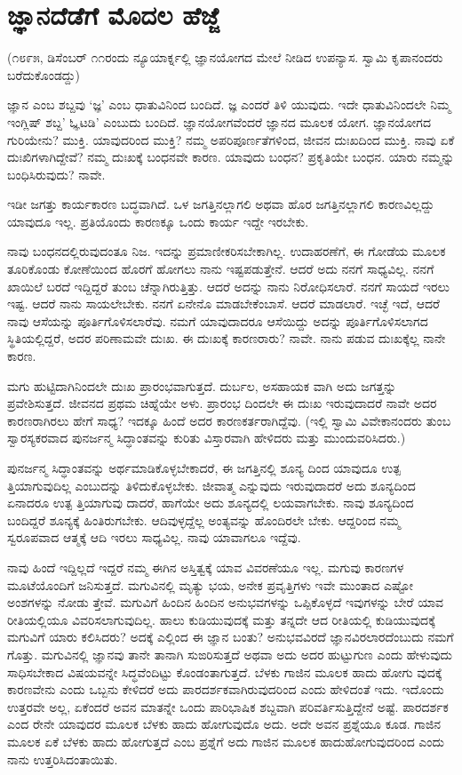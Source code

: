 
\chapter{ಜ್ಞಾನದೆಡೆಗೆ ಮೊದಲ ಹೆಜ್ಜೆ}

(೧೮೯೫, ಡಿಸೆಂಬರ್ ೧೧ರಂದು ನ್ಯೂಯಾರ್ಕ್ನಲ್ಲಿ ಜ್ಞಾನಯೋಗದ ಮೇಲೆ ನೀಡಿದ ಉಪನ್ಯಾಸ. ಸ್ವಾಮಿ ಕೃಪಾನಂದರು ಬರೆದುಕೊಂಡದ್ದು)

ಜ್ಞಾನ ಎಂಬ ಶಬ್ದವು ‘ಜ್ಞ’ ಎಂಬ ಧಾತುವಿನಿಂದ ಬಂದಿದೆ. ಜ್ಞ ಎಂದರೆ ತಿಳಿ ಯುವುದು. ಇದೇ ಧಾತುವಿನಿಂದಲೇ ನಿಮ್ಮ ಇಂಗ್ಲಿಷ್ ಶಬ್ದ’ ಓ್ಞಟಡಿ’ ಎಂಬುದು ಬಂದಿದೆ. ಜ್ಞಾನಯೋಗವೆಂದರೆ ಜ್ಞಾನದ ಮೂಲಕ ಯೋಗ. ಜ್ಞಾನಯೋಗದ ಗುರಿಯೇನು? ಮುಕ್ತಿ. ಯಾವುದರಿಂದ ಮುಕ್ತಿ? ನಮ್ಮ ಅಪರಿಪೂರ್ಣತೆಗಳಿಂದ, ಜೀವನ ದುಃಖದಿಂದ ಮುಕ್ತಿ. ನಾವು ಏಕೆ ದುಃಖಿಗಳಾಗಿದ್ದೇವೆ? ನಮ್ಮ ದುಃಖಕ್ಕೆ ಬಂಧನವೇ ಕಾರಣ. ಯಾವುದು ಬಂಧನ? ಪ್ರಕೃತಿಯೇ ಬಂಧನ. ಯಾರು ನಮ್ಮನ್ನು ಬಂಧಿಸಿರುವುದು? ನಾವೇ.

ಇಡೀ ಜಗತ್ತು ಕಾರ್ಯಕಾರಣ ಬದ್ಧವಾಗಿದೆ. ಒಳ ಜಗತ್ತಿನಲ್ಲಾಗಲಿ ಅಥವಾ ಹೊರ ಜಗತ್ತಿನಲ್ಲಾಗಲಿ ಕಾರಣವಿಲ್ಲದ್ದು ಯಾವುದೂ ಇಲ್ಲ. ಪ್ರತಿಯೊಂದು ಕಾರಣಕ್ಕೂ ಒಂದು ಕಾರ್ಯ ಇದ್ದೇ ಇರಬೇಕು.

ನಾವು ಬಂಧನದಲ್ಲಿರುವುದಂತೂ ನಿಜ. ಇದನ್ನು ಪ್ರಮಾಣೀಕರಿಸಬೇಕಾಗಿಲ್ಲ. ಉದಾಹರಣೆಗೆ, ಈ ಗೋಡೆಯ ಮೂಲಕ ತೂರಿಕೊಂಡು ಕೋಣೆಯಿಂದ ಹೊರಗೆ ಹೋಗಲು ನಾನು ಇಷ್ಟಪಡುತ್ತೇನೆ. ಆದರೆ ಅದು ನನಗೆ ಸಾಧ್ಯವಿಲ್ಲ. ನನಗೆ ಖಾಯಿಲೆ ಬರದೆ ಇದ್ದಿದ್ದರೆ ತುಂಬ ಚೆನ್ನಾಗಿರುತ್ತಿತ್ತು. ಆದರೆ ಅದನ್ನು ನಾನು ನಿರೋಧಿಸಲಾರೆ. ನನಗೆ ಸಾಯದೆ ಇರಲು ಇಷ್ಟ. ಆದರೆ ನಾನು ಸಾಯಲೇಬೇಕು. ನನಗೆ ಏನೇನೊ ಮಾಡಬೇಕೆಂಬಾಸೆ. ಆದರೆ ಮಾಡಲಾರೆ. ಇಚ್ಛೆ ಇದೆ, ಆದರೆ ನಾವು ಆಸೆಯನ್ನು ಪೂರ್ತಿಗೊಳಿಸಲಾರೆವು. ನಮಗೆ ಯಾವುದಾದರೂ ಆಸೆಯಿದ್ದು ಅದನ್ನು ಪೂರ್ತಿಗೊಳಿಸಲಾಗದ ಸ್ಥಿತಿಯಲ್ಲಿದ್ದರೆ, ಅದರ ಪರಿಣಾಮವೇ ದುಃಖ. ಈ ದುಃಖಕ್ಕೆ ಕಾರಣರಾರು? ನಾವೇ. ನಾನು ಪಡುವ ದುಃಖಕ್ಕೆಲ್ಲ ನಾನೇ ಕಾರಣ.

ಮಗು ಹುಟ್ಟಿದಾಗಿನಿಂದಲೇ ದುಃಖ ಪ್ರಾರಂಭವಾಗುತ್ತದೆ. ದುರ್ಬಲ, ಅಸಹಾಯಕ ವಾಗಿ ಅದು ಜಗತ್ತನ್ನು ಪ್ರವೇಶಿಸುತ್ತದೆ. ಜೀವನದ ಪ್ರಥಮ ಚಿಹ್ನೆಯೇ ಅಳು. ಪ್ರಾರಂಭ ದಿಂದಲೇ ಈ ದುಃಖ ಇರುವುದಾದರೆ ನಾವೇ ಅದರ ಕಾರಣರಾಗಿರಲು ಹೇಗೆ ಸಾಧ್ಯ? ಇದಕ್ಕೂ ಹಿಂದೆ ಅದರ ಕಾರಣಕರ್ತರಾಗಿದ್ದೆವು. (ಇಲ್ಲಿ ಸ್ವಾಮಿ ವಿವೇಕಾನಂದರು ತುಂಬ ಸ್ವಾರಸ್ಯಕರವಾದ ಪುನರ್ಜನ್ಮ ಸಿದ್ಧಾಂತವನ್ನು ಕುರಿತು ವಿಸ್ತಾರವಾಗಿ ಹೇಳಿದರು ಮತ್ತು ಮುಂದುವರಿಸಿದರು.)

ಪುನರ್ಜನ್ಮ ಸಿದ್ಧಾಂತವನ್ನು ಅರ್ಥಮಾಡಿಕೊಳ್ಳಬೇಕಾದರೆ, ಈ ಜಗತ್ತಿನಲ್ಲಿ ಶೂನ್ಯ ದಿಂದ ಯಾವುದೂ ಉತ್ಪ ತ್ತಿಯಾಗುವುದಿಲ್ಲ ಎಂಬುದನ್ನು ತಿಳಿದುಕೊಳ್ಳಬೇಕು. ಜೀವಾತ್ಮ ಎನ್ನುವುದು ಇರುವುದಾದರೆ ಅದು ಶೂನ್ಯದಿಂದ ಏನಾದರೂ ಉತ್ಪ ತ್ತಿಯಾಗುವು ದಾದರೆ, ಹಾಗೆಯೇ ಅದು ಶೂನ್ಯದಲ್ಲಿ ಲಯವಾಗಬೇಕು. ನಾವು ಶೂನ್ಯದಿಂದ ಬಂದಿದ್ದರೆ ಶೂನ್ಯಕ್ಕೆ ಹಿಂತಿರುಗಬೇಕು. ಆದಿವುಳ್ಳದ್ದೆಲ್ಲ ಅಂತ್ಯವನ್ನು ಹೊಂದಿರಲೇ ಬೇಕು. ಆದ್ದರಿಂದ ನಮ್ಮ ಸ್ವರೂಪವಾದ ಆತ್ಮಕ್ಕೆ ಆದಿ ಇರಲು ಸಾಧ್ಯವಿಲ್ಲ. ನಾವು ಯಾವಾಗಲೂ ಇದ್ದೆವು.

ನಾವು ಹಿಂದೆ ಇದ್ದಿಲ್ಲದೆ ಇದ್ದರೆ ನಮ್ಮ ಈಗಿನ ಅಸ್ತಿತ್ವಕ್ಕೆ ಯಾವ ವಿವರಣೆಯೂ ಇಲ್ಲ. ಮಗುವು ಕಾರಣಗಳ ಮೂಟೆಯೊಂದಿಗೆ ಜನಿಸುತ್ತದೆ. ಮಗುವಿನಲ್ಲಿ ಮೃತ್ಯು ಭಯ, ಅನೇಕ ಪ್ರವೃತ್ತಿಗಳು ಇವೇ ಮುಂತಾದ ಎಷ್ಟೋ ಅಂಶಗಳನ್ನು ನೋಡು ತ್ತೇವೆ. ಮಗುವಿಗೆ ಹಿಂದಿನ ಹಿಂದಿನ ಅನುಭವಗಳನ್ನು ಒಪ್ಪಿಕೊಳ್ಳದೆ ಇವುಗಳನ್ನು ಬೇರೆ ಯಾವ ರೀತಿಯಲ್ಲಿಯೂ ವಿವರಿಸಲಾಗುವುದಿಲ್ಲ. ಹಾಲು ಕುಡಿಯುವುದಕ್ಕೆ ಮತ್ತು ತನ್ನದೇ ಆದ ರೀತಿಯಲ್ಲಿ ಕುಡಿಯುವುದಕ್ಕೆ ಮಗುವಿಗೆ ಯಾರು ಕಲಿಸಿದರು? ಅದಕ್ಕೆ ಎಲ್ಲಿಂದ ಈ ಜ್ಞಾನ ಬಂತು? ಅನುಭವವಿರದೆ ಜ್ಞಾನವಿರಲಾರದೆಂಬುದು ನಮಗೆ ಗೊತ್ತು. ಮಗುವಿನಲ್ಲಿ ಜ್ಞಾನವು ತಾನೇ ತಾನಾಗಿ ಸುಙರಿಸುತ್ತದೆ ಅಥವಾ ಅದು ಅದರ ಹುಟ್ಟುಗುಣ ಎಂದು ಹೇಳುವುದು ಸಾಧಿಸಬೇಕಾದ ವಿಷಯವನ್ನೇ ಸಿದ್ಧವೆಂದಿಟ್ಟು ಕೊಂಡಂತಾಗುತ್ತದೆ.  ಬೆಳಕು ಗಾಜಿನ ಮೂಲಕ ಹಾದು ಹೋಗು ವುದಕ್ಕೆ ಕಾರಣವೇನು ಎಂದು ಒಬ್ಬನು ಕೇಳಿದರೆ ಅದು ಪಾರದರ್ಶಕವಾಗಿರುವುದರಿಂದ ಎಂದು ಹೇಳಿದಂತೆ ಇದು. ಇದೊಂದು ಉತ್ತರವೇ ಅಲ್ಲ, ಏಕೆಂದರೆ ಅವನ ಮಾತನ್ನೇ ಒಂದು ಪಾರಿಭಾಷಿಕ ಶಬ್ದವಾಗಿ ಪರಿವರ್ತಿಸುತ್ತಿದ್ದೇನೆ ಅಷ್ಟೆ. ಪಾರದರ್ಶಕ ಎಂದ ರೇನೇ ಯಾವುದರ ಮೂಲಕ ಬೆಳಕು ಹಾದು ಹೋಗುವುದೊ ಅದು. ಅದೇ ಅವನ ಪ್ರಶ್ನೆಯೂ ಕೂಡ. ಗಾಜಿನ ಮೂಲಕ ಏಕೆ ಬೆಳಕು ಹಾದು ಹೋಗುತ್ತದೆ ಎಂಬ ಪ್ರಶ್ನೆಗೆ ಅದು ಗಾಜಿನ ಮೂಲಕ ಹಾದುಹೋಗುವುದರಿಂದ ಎಂದು ನಾನು ಉತ್ತರಿಸಿದಂತಾಯಿತು.


